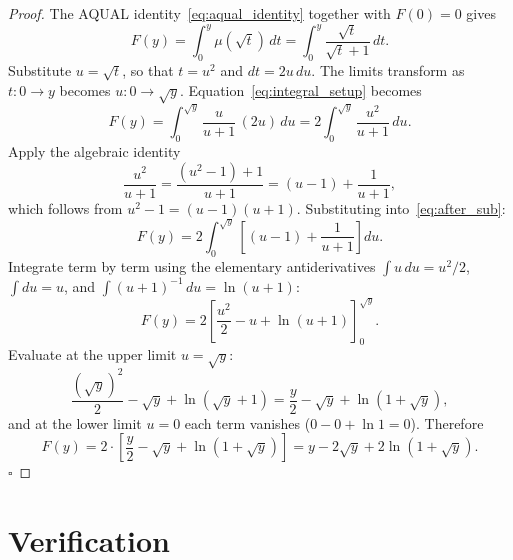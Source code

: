 \documentclass[twocolumn]{iopjournal}
\theoremstyle{definition}
\begin{document}
\begin{proof}
The AQUAL identity~\eqref{eq:aqual_identity} together with
$F(0) = 0$ gives
\begin{equation}
  F(y) = \int_0^y \mu(\sqrt{t})\, dt
       = \int_0^y \frac{\sqrt{t}}{\sqrt{t} + 1}\, dt.
  \label{eq:integral_setup}
\end{equation}
Substitute $u = \sqrt{t}$, so that $t = u^2$ and $dt = 2u\, du$.
The limits transform as $t: 0 \to y$ becomes $u: 0 \to \sqrt{y}$.
Equation~\eqref{eq:integral_setup} becomes
\begin{equation}
  F(y) = \int_0^{\sqrt{y}} \frac{u}{u+1}\,(2u)\, du
       = 2\int_0^{\sqrt{y}} \frac{u^2}{u+1}\, du.
  \label{eq:after_sub}
\end{equation}
Apply the algebraic identity
\begin{equation}
  \frac{u^2}{u+1} = \frac{(u^2 - 1) + 1}{u+1}
                  = (u - 1) + \frac{1}{u+1},
  \label{eq:long_division}
\end{equation}
which follows from $u^2 - 1 = (u-1)(u+1)$.  Substituting
into~\eqref{eq:after_sub}:
\begin{equation}
  F(y) = 2\int_0^{\sqrt{y}}
         \left[(u - 1) + \frac{1}{u+1}\right] du.
\end{equation}
Integrate term by term using the elementary antiderivatives
$\int u\, du = u^2/2$, $\int du = u$, and
$\int (u+1)^{-1}\, du = \ln(u+1)$:
\begin{equation}
  F(y) = 2\left[\frac{u^2}{2} - u + \ln(u+1)\right]_0^{\sqrt{y}}.
\end{equation}
Evaluate at the upper limit $u = \sqrt{y}$:
\begin{equation}
  \frac{(\sqrt{y})^2}{2} - \sqrt{y} + \ln(\sqrt{y} + 1)
  = \frac{y}{2} - \sqrt{y} + \ln(1 + \sqrt{y}),
\end{equation}
and at the lower limit $u = 0$ each term vanishes
($0 - 0 + \ln 1 = 0$).  Therefore
\begin{equation}
  F(y) = 2 \cdot \left[\frac{y}{2} - \sqrt{y}
       + \ln(1 + \sqrt{y})\right]
       = y - 2\sqrt{y} + 2\ln(1 + \sqrt{y}).
\end{equation}
\hfill$\square$
\end{proof}


\section*{Verification}
\end{document}
